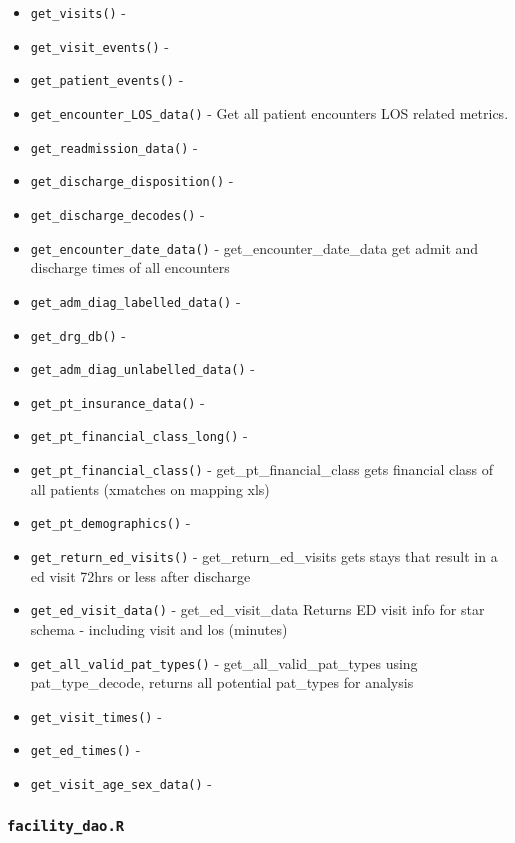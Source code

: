 \documentclass[
]{book}
\providecommand{\tightlist}{%
  \setlength{\itemsep}{0pt}\setlength{\parskip}{0pt}}
\begin{document}
\begin{itemize}
\tightlist
\item
  \texttt{get\_visits()} -
\item
  \texttt{get\_visit\_events()} -
\item
  \texttt{get\_patient\_events()} -
\item
  \texttt{get\_encounter\_LOS\_data()} - Get all patient encounters LOS related metrics.
\item
  \texttt{get\_readmission\_data()} -
\item
  \texttt{get\_discharge\_disposition()} -
\item
  \texttt{get\_discharge\_decodes()} -
\item
  \texttt{get\_encounter\_date\_data()} - get\_encounter\_date\_data get admit and discharge times of all encounters
\item
  \texttt{get\_adm\_diag\_labelled\_data()} -
\item
  \texttt{get\_drg\_db()} -
\item
  \texttt{get\_adm\_diag\_unlabelled\_data()} -
\item
  \texttt{get\_pt\_insurance\_data()} -
\item
  \texttt{get\_pt\_financial\_class\_long()} -
\item
  \texttt{get\_pt\_financial\_class()} - get\_pt\_financial\_class gets financial class of all patients (xmatches on mapping xls)
\item
  \texttt{get\_pt\_demographics()} -
\item
  \texttt{get\_return\_ed\_visits()} - get\_return\_ed\_visits gets stays that result in a ed visit 72hrs or less after discharge
\item
  \texttt{get\_ed\_visit\_data()} - get\_ed\_visit\_data Returns ED visit info for star schema - including visit and los (minutes)
\item
  \texttt{get\_all\_valid\_pat\_types()} - get\_all\_valid\_pat\_types using pat\_type\_decode, returns all potential pat\_types for analysis
\item
  \texttt{get\_visit\_times()} -
\item
  \texttt{get\_ed\_times()} -
\item
  \texttt{get\_visit\_age\_sex\_data()} -
\end{itemize}

\hypertarget{facility_dao.r}{%
\subsubsection{\texorpdfstring{\texttt{facility\_dao.R}}{facility\_dao.R}}\label{facility_dao.r}}
\end{document}

